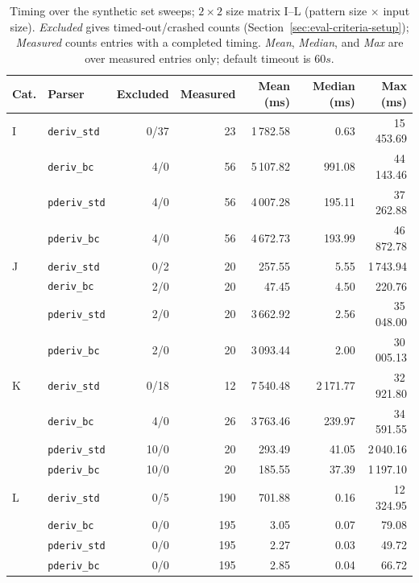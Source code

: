 \begin{table}[H]
\centering
\small
\setlength{\tabcolsep}{4pt}
\begin{tabular*}{\textwidth}{@{\extracolsep{\fill}} llrrrrr}
\hline
Cat. & Parser & Excluded & Measured & Mean (ms) & Median (ms) & Max (ms) \\
\hline
I & \texttt{deriv\_std} & 0/37 &  23 & 1\,782.58 &    0.63 & 15\,453.69 \\
  & \texttt{deriv\_bc}        & 4/0 &  56 & 5\,107.82 &  991.08 & 44\,143.46 \\
  & \texttt{pderiv\_std}      & 4/0 &  56 & 4\,007.28 &  195.11 & 37\,262.88 \\
  & \texttt{pderiv\_bc}       & 4/0 &  56 & 4\,672.73 &  193.99 & 46\,872.78 \\
\hline
J & \texttt{deriv\_std} & 0/2 &  20 & 257.55 &  5.55 & 1\,743.94 \\
  & \texttt{deriv\_bc}        & 2/0 &  20 &  47.45 &  4.50 &   220.76 \\
  & \texttt{pderiv\_std}      & 2/0 &  20 & 3\,662.92 &  2.56 & 35\,048.00 \\
  & \texttt{pderiv\_bc}       & 2/0 &  20 & 3\,093.44 &  2.00 & 30\,005.13 \\
\hline
K & \texttt{deriv\_std} & 0/18 &  12 & 7\,540.48 & 2\,171.77 & 32\,921.80 \\
  & \texttt{deriv\_bc}        & 4/0 &  26 & 3\,763.46 &   239.97 & 34\,591.55 \\
  & \texttt{pderiv\_std}      & 10/0 &  20 &   293.49 &    41.05 &  2\,040.16 \\
  & \texttt{pderiv\_bc}       & 10/0 &  20 &   185.55 &    37.39 &  1\,197.10 \\
\hline
L & \texttt{deriv\_std} & 0/5 & 190 & 701.88 & 0.16 & 12\,324.95 \\
  & \texttt{deriv\_bc}        & 0/0 & 195 &   3.05 & 0.07 &     79.08 \\
  & \texttt{pderiv\_std}      & 0/0 & 195 &   2.27 & 0.03 &     49.72 \\
  & \texttt{pderiv\_bc}       & 0/0 & 195 &   2.85 & 0.04 &     66.72 \\
\hline
\end{tabular*}
\caption{Timing over the synthetic set sweeps;
$2\times 2$ size matrix I--L (pattern size $\times$ input size).
\emph{Excluded} gives timed-out/crashed
counts (Section~\ref{sec:eval-criteria-setup}); \emph{Measured}
counts entries with a completed timing. \emph{Mean}, \emph{Median}, and
\emph{Max} are over measured entries only; default timeout is $60s$.
}
\label{tab:patho-timing-size}
\end{table}

